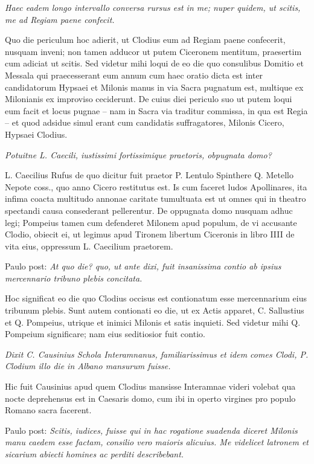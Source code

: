 \textit{Haec eadem longo intervallo conversa rursus est in me; nuper quidem, ut scitis, me ad Regiam paene confecit.}

Quo die periculum hoc adierit, ut Clodius eum ad Regiam paene confecerit, nusquam inveni; non tamen adducor ut putem Ciceronem mentitum, praesertim cum adiciat ut scitis. Sed videtur mihi loqui de eo die quo consulibus Domitio et Messala qui praecesserant eum annum cum haec oratio dicta est inter candidatorum Hypsaei et Milonis manus in via Sacra pugnatum est, multique ex Milonianis ex improviso ceciderunt. De cuius diei periculo suo ut putem loqui eum facit et locus pugnae – nam in Sacra via traditur commissa, in qua est Regia – et quod adsidue simul erant cum candidatis suffragatores, Milonis Cicero, Hypsaei Clodius.

\textit{Potuitne L. Caecili, iustissimi fortissimique praetoris, obpugnata domo?}

L. Caecilius Rufus de quo dicitur fuit praetor P. Lentulo Spinthere Q. Metello Nepote coss., quo anno Cicero restitutus est. Is cum faceret ludos Apollinares, ita infima coacta multitudo annonae caritate tumultuata est ut omnes qui in theatro spectandi causa consederant pellerentur. De oppugnata domo nusquam adhuc legi; Pompeius tamen cum defenderet Milonem apud populum, de vi accusante Clodio, obiecit ei, ut legimus apud Tironem libertum Ciceronis in libro IIII de vita eius, oppressum L. Caecilium praetorem.

Paulo post: \textit{At quo die? quo, ut ante dixi, fuit insanissima contio ab ipsius mercennario tribuno plebis concitata.}

Hoc significat eo die quo Clodius occisus est contionatum esse mercennarium eius tribunum plebis. Sunt autem contionati eo die, ut ex Actis apparet, C. Sallustius et Q. Pompeius, utrique et inimici Milonis et satis inquieti. Sed videtur mihi Q. Pompeium significare; nam eius seditiosior fuit contio.

\textit{Dixit C. Causinius Schola Interamnanus, familiarissimus et idem comes Clodi, P. Clodium illo die in Albano mansurum fuisse.}

Hic fuit Causinius apud quem Clodius mansisse Interamnae videri volebat qua nocte deprehensus est in Caesaris domo, cum ibi in operto virgines pro populo Romano sacra facerent.

Paulo post: \textit{Scitis, iudices, fuisse qui in hac rogatione suadenda diceret Milonis manu caedem esse factam, consilio vero maioris alicuius. Me videlicet latronem et sicarium abiecti homines ac perditi describebant.}


